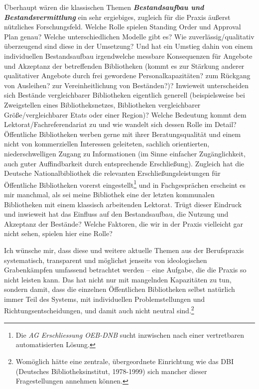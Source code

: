 \documentclass[a4paper,
fontsize=11pt,
oneside,
numbers=noperiodatend,
parskip=half-,
bibliography=totoc,
final
]{scrartcl}
\begin{document}
Überhaupt wären die klassischen Themen \textbf{\emph{Bestandsaufbau und
Bestandsvermittlung}} ein sehr ergiebiges, zugleich für die Praxis
äußerst nützliches Forschungsfeld. Welche Rolle spielen Standing Order
und Approval Plan genau? Welche unterschiedlichen Modelle gibt es? Wie
zuverlässig/qualitativ überzeugend sind diese in der Umsetzung? Und hat
ein Umstieg dahin von einem individuellen Bestandsaufbau irgendwelche
messbare Konsequenzen für Angebote und Akzeptanz der betreffenden
Bibliotheken (kommt es zur Stärkung anderer qualitativer Angebote durch
frei gewordene Personalkapazitäten? zum Rückgang von Ausleihen? zur
Vereinheitlichung von Beständen?)? Inwieweit unterscheiden sich Bestände
vergleichbarer Bibliotheken eigentlich generell (beispielsweise bei
Zweigstellen eines Bibliotheksnetzes, Bibliotheken vergleichbarer
Größe/vergleichbarer Etats oder einer Region)? Welche Bedeutung kommt
dem Lektorat/Fachreferendariat zu und wie wandelt sich dessen Rolle im
Detail? Öffentliche Bibliotheken werben gerne mit ihrer
Beratungsqualität und einem nicht von kommerziellen Interessen
geleiteten, sachlich orientierten, niederschwelligen Zugang zu
Informationen (im Sinne einfacher Zugänglichkeit, auch guter
Auffindbarkeit durch entsprechende Erschließung). Zugleich hat die
Deutsche Nationalbibliothek die relevanten Erschließungsleistungen für
Öffentliche Bibliotheken vorerst eingestellt\footnote{Die \emph{AG
  Erschliessung OEB-DNB} sucht inzwischen nach einer vertretbaren
  automatisierten Lösung.} und in Fachgesprächen erscheint es mir
manchmal, als sei meine Bibliothek eine der letzten kommunalen
Bibliotheken mit einem klassisch arbeitenden Lektorat. Trügt dieser
Eindruck und inwieweit hat das Einfluss auf den Bestandsaufbau, die
Nutzung und Akzeptanz der Bestände? Welche Faktoren, die wir in der
Praxis vielleicht gar nicht sehen, spielen hier eine Rolle?

Ich wünsche mir, dass diese und weitere aktuelle Themen aus der
Berufspraxis systematisch, transparent und möglichst jenseits von
ideologischen Grabenkämpfen umfassend betrachtet werden -- eine Aufgabe,
die die Praxis so nicht leisten kann. Das hat nicht nur mit mangelnden
Kapazitäten zu tun, sondern damit, dass die einzelnen Öffentlichen
Bibliotheken selbst natürlich immer Teil des Systems, mit individuellen
Problemstellungen und Richtungsentscheidungen, und damit auch nicht
neutral sind.\footnote{Womöglich hätte eine zentrale, übergeordnete
  Einrichtung wie das DBI (Deutsches Bibliotheksinstitut, 1978-1999)
  sich mancher dieser Fragestellungen annehmen können.}
\end{document}
